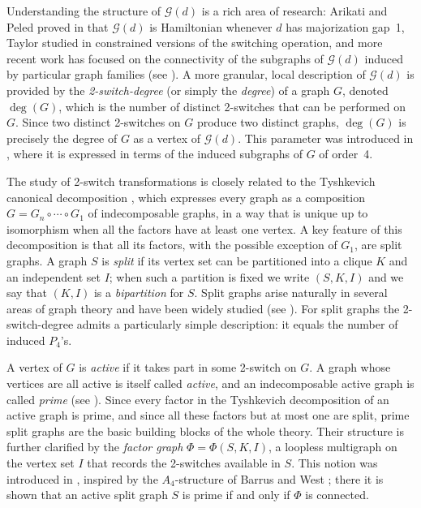 \documentclass[11pt]{article}
\begin{document}
Understanding the structure of $\mathcal{G}(d)$ is a rich area of
research: Arikati and Peled proved in \cite{arikati1999realization} that $\mathcal{G}(d)$ is Hamiltonian
whenever $d$ has majorization gap~1,
Taylor studied in \cite{taylor2006contrained} constrained versions of the switching operation, and more recent work has focused on the
connectivity of the subgraphs of $\mathcal{G}(d)$ induced by particular
graph families (see  \cite{schvollner_pseudoforests}).
A more granular, local description of $\mathcal{G}(d)$ is provided by
the \emph{2-switch-degree} (or simply the \emph{degree}) of a graph $G$,
denoted $\deg(G)$, which is the number of distinct 2-switches that can
be performed on $G$. Since two distinct 2-switches on $G$ produce two
distinct graphs, $\deg(G)$ is precisely the degree of $G$ as a vertex of
$\mathcal{G}(d)$. This parameter was introduced
in \cite{pastine20252}, where it is expressed in terms of the induced
subgraphs of $G$ of order~4.

The study of 2-switch transformations is closely related to the
Tyshkevich canonical decomposition \cite{tyshkevich2000decomposition}, which expresses every graph as a
composition $G=G_n\circ\cdots\circ G_1$ of indecomposable graphs, in a
way that is unique up to isomorphism when all the factors have at least one vertex. A key feature of this decomposition
is that all its factors, with the possible exception of $G_1$, are split
graphs. A graph $S$ is \emph{split} if its vertex set can be
partitioned into a clique $K$ and an independent set $I$; when such a
partition is fixed we write
$(S,K,I)$ and we say that $(K,I)$ is a \emph{bipartition} for $S$. Split graphs arise naturally in several areas of graph theory
and have been widely studied
(see \cite{hammer1977split, splitnordhausgaddum, whitman2020split,jaume2025nullspace}). For split graphs the 2-switch-degree admits a
particularly simple description: it equals the number of induced
$P_4$'s.

A vertex of $G$ is \emph{active} if it takes part in some 2-switch on $G$. A graph whose vertices are all active is itself called \emph{active}, and an indecomposable active graph is called \emph{prime}
(see \cite{pastine20252}). Since every factor in the Tyshkevich decomposition
of an active graph is prime, and since all these factors but at most one
are split, prime split graphs are the basic building blocks of the whole
theory. Their structure is further clarified by the \emph{factor graph}
$\Phi=\Phi(S,K,I)$, a loopless multigraph on the vertex set $I$ that records the
2-switches available in $S$. This notion was introduced
in \cite{pastine2025simple}, inspired by the $A_4$-structure of Barrus
and West \cite{barrus.west.A4}; there it is shown that an active split
graph $S$ is prime if and only if $\Phi$ is connected.
\end{document}
